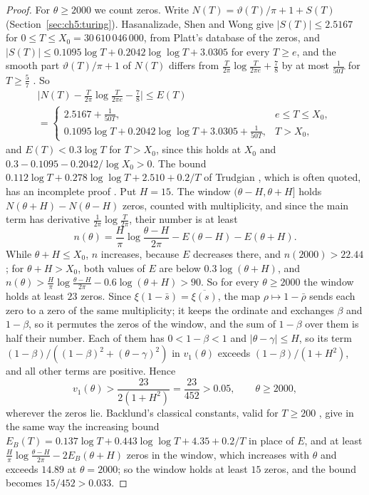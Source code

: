 \begin{proof}
For $\theta\ge2000$ we count zeros. Write $N(T)=\vartheta(T)/\pi+1+S(T)$ (Section~\ref{sec:ch5:turing}). Hasanalizade, Shen and Wong \cite[(1.7) and Corollary~1.4]{HSW22} give $|S(T)|\le2.5167$ for $0\le T\le X_0=30\,610\,046\,000$, from Platt's database of the zeros, and $|S(T)|\le0.1095\log T+0.2042\log\log T+3.0305$ for every $T\ge e$, and the smooth part $\vartheta(T)/\pi+1$ of $N(T)$ differs from $\frac T{2\pi}\log\frac T{2\pi e}+\frac78$ by at most $\frac1{50T}$ for $T\ge\frac57$ \cite[(2.7)]{HSW22}. So
\begin{multline*}
\Big|N(T)-\frac T{2\pi}\log\frac T{2\pi e}-\frac78\Big|\le E(T)\\
=\begin{cases}2.5167+\frac1{50T},&e\le T\le X_0,\\0.1095\log T+0.2042\log\log T+3.0305+\frac1{50T},&T>X_0,\end{cases}
\end{multline*}
and $E(T)<0.3\log T$ for $T>X_0$, since this holds at $X_0$ and $0.3-0.1095-0.2042/\log X_0>0$. The bound $0.112\log T+0.278\log\log T+2.510+0.2/T$ of Trudgian \cite{Trudgian}, which is often quoted, has an incomplete proof \cite{BMOR21,HSW22}. Put $H=15$. The window $(\theta-H,\theta+H]$ holds $N(\theta+H)-N(\theta-H)$ zeros, counted with multiplicity, and since the main term has derivative $\frac1{2\pi}\log\frac T{2\pi}$, their number is at least
\[
n(\theta)=\frac H\pi\log\frac{\theta-H}{2\pi}-E(\theta-H)-E(\theta+H).
\]
While $\theta+H\le X_0$, $n$ increases, because $E$ decreases there, and $n(2000)>22.44$; for $\theta+H>X_0$, both values of $E$ are below $0.3\log(\theta+H)$, and $n(\theta)>\frac H\pi\log\frac{\theta-H}{2\pi}-0.6\log(\theta+H)>90$. So for every $\theta\ge2000$ the window holds at least $23$ zeros. Since $\xi(1-\bar s)=\overline{\xi(s)}$, the map $\rho\mapsto1-\bar\rho$ sends each zero to a zero of the same multiplicity; it keeps the ordinate and exchanges $\beta$ and $1-\beta$, so it permutes the zeros of the window, and the sum of $1-\beta$ over them is half their number. Each of them has $0<1-\beta<1$ and $|\theta-\gamma|\le H$, so its term $(1-\beta)/((1-\beta)^2+(\theta-\gamma)^2)$ in $v_1(\theta)$ exceeds $(1-\beta)/(1+H^2)$, and all other terms are positive. Hence
\[
v_1(\theta)>\frac{23}{2(1+H^2)}=\frac{23}{452}>0.05,\qquad \theta\ge2000,
\]
wherever the zeros lie. Backlund's classical constants, valid for $T\ge200$ \cite{Backlund}, give in the same way the increasing bound $E_B(T)=0.137\log T+0.443\log\log T+4.35+0.2/T$ in place of $E$, and at least $\frac H\pi\log\frac{\theta-H}{2\pi}-2E_B(\theta+H)$ zeros in the window, which increases with $\theta$ and exceeds $14.89$ at $\theta=2000$; so the window holds at least $15$ zeros, and the bound becomes $15/452>0.033$.


\end{proof}
